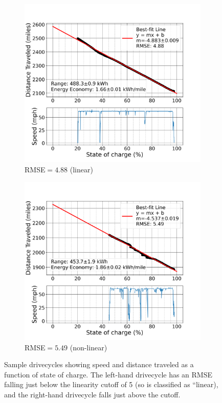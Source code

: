 \begin{figure}[ht]
    \centering
    \begin{subfigure}[b]{0.48\textwidth}
        \centering
        \includegraphics[width=\textwidth]{figures/distance_vs_soc_below_cutoff.png}
        \caption{RMSE$ = 4.88$ (linear)}
        \label{fig:distance_vs_soc_below_cutoff}
    \end{subfigure}
    \hfill
    \begin{subfigure}[b]{0.48\textwidth}
        \centering
        \includegraphics[width=\textwidth]{figures/distance_vs_soc_above_cutoff.png}
        \caption{RMSE$ = 5.49$ (non-linear)}
        \label{fig:distance_vs_soc_above_cutoff}
    \end{subfigure}
    \caption{Sample drivecycles showing speed and distance traveled as a function of state of charge. The left-hand drivecycle has an RMSE falling just below the linearity cutoff of 5 (so is classified as ``linear), and the right-hand drivecycle falls just above the cutoff.}
    \label{fig:distance_vs_soc_cutoff}
\end{figure}

